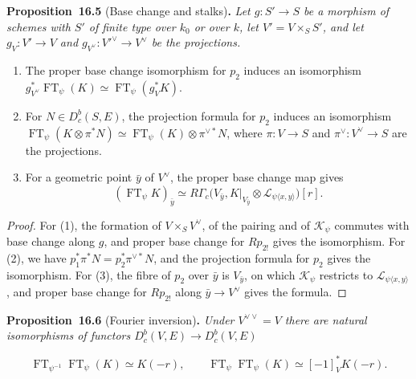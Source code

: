 \documentclass[11pt]{article}
\newenvironment{bpstatement}[2]{\par\addvspace{0.6\baselineskip}\noindent\textbf{#1}#2\textbf{.}\enspace\ignorespaces}
  {\par\addvspace{0.4\baselineskip}}
\newenvironment{bpstatementit}[2]{\begin{bpstatement}{#1}{#2}\itshape\ignorespaces}{\end{bpstatement}}
\providecommand{\Dbc}{}\renewcommand{\Dbc}{D^b_c}
\begin{document}
\label{bp183}%
\begin{bpstatementit}{Proposition~16.5}{ (Base change and stalks)}
Let \(g:S'\to S\) be a morphism of schemes with \(S'\) of finite type over \(k_0\) or over \(k\), let \(V'=V\times_SS'\), and let \(g_V:V'\to V\) and \(g_{V^\vee}:V'^\vee\to V^\vee\) be the projections.

\begin{enumerate}
\item The proper base change isomorphism for \(p_2\) induces an isomorphism \(g_{V^\vee}^*\operatorname{FT}_\psi(K)\simeq
  \operatorname{FT}_\psi(g_V^*K)\).
\item For \(N\in\Dbc(S,E)\), the projection formula for \(p_2\) induces an isomorphism \(\operatorname{FT}_\psi(K\otimes\pi^*N)\simeq
  \operatorname{FT}_\psi(K)\otimes\pi^{\vee*}N\), where \(\pi:V\to S\) and \(\pi^\vee:V^\vee\to S\) are the projections.
\item For a geometric point \(\bar y\) of \(V^\vee\), the proper base change map gives \[
   (\operatorname{FT}_\psi K)_{\bar y}
   \simeq
   R\Gamma_c\bigl(V_{\bar y},
   K|_{V_{\bar y}}\otimes
   \mathcal L_{\psi\langle x,y\rangle}\bigr)[r].
   \tag{16.2}
   \]
\end{enumerate}
\end{bpstatementit}

\begin{proof}[{Proof}]\label{bp184}%
For (1), the formation of \(V\times_SV^\vee\), of the pairing and of \(\mathcal K_\psi\) commutes with base change along \(g\), and proper base change for \(Rp_{2!}\) gives the isomorphism. For (2), we have \(p_1^*\pi^*N=p_2^*\pi^{\vee*}N\), and the projection formula for \(p_2\) gives the isomorphism. For (3), the fibre of \(p_2\) over \(\bar y\) is \(V_{\bar y}\), on which \(\mathcal K_\psi\) restricts to \(\mathcal L_{\psi\langle x,y\rangle}\), and proper base change for \(Rp_{2!}\) along \(\bar y\to V^\vee\) gives the formula.
\end{proof}

\label{bp185}%
\begin{bpstatementit}{Proposition~16.6}{ (Fourier inversion)}
Under \(V^{\vee\vee}=V\) there are natural isomorphisms of functors \(\Dbc(V,E)\to\Dbc(V,E)\)

\[
\operatorname{FT}_{\psi^{-1}}\operatorname{FT}_\psi(K)
\simeq K(-r),
\qquad
\operatorname{FT}_{\psi}\operatorname{FT}_\psi(K)
\simeq [-1]_V^*K(-r).
\]
\end{bpstatementit}
\end{document}
